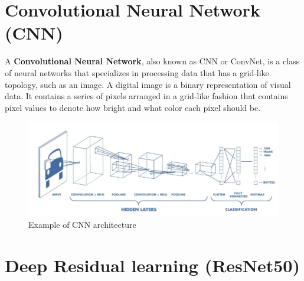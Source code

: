 \section{Convolutional Neural Network (CNN)}
A \textbf{Convolutional Neural Network}, also known as CNN or ConvNet, is a class of neural networks that specializes in processing data that has a grid-like topology, such as an image. A digital image is a binary representation of visual data. It contains a series of pixels arranged in a grid-like fashion that contains pixel values to denote how bright and what color each pixel should be. \cite{cnn}
\begin{figure}[hbtp]
\caption{Example of CNN architecture}
\centering
\includegraphics[scale=0.5]{../Images/cnnarch.png}
\end{figure}

\section{Deep Residual learning (ResNet50)}
